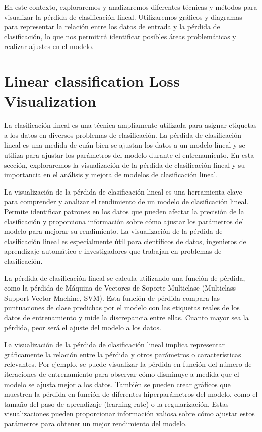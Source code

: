 \documentclass[twoside,10pt]{article}
\numberwithin{equation}{section}
\begin{document}
En este contexto, exploraremos y analizaremos diferentes técnicas y métodos para visualizar la pérdida de clasificación lineal. Utilizaremos gráficos y diagramas para representar la relación entre los datos de entrada y la pérdida de clasificación, lo que nos permitirá identificar posibles áreas problemáticas y realizar ajustes en el modelo.

\section{Linear classification Loss Visualization}

La clasificación lineal es una técnica ampliamente utilizada para asignar etiquetas a los datos en diversos problemas de clasificación. La pérdida de clasificación lineal es una medida de cuán bien se ajustan los datos a un modelo lineal y se utiliza para ajustar los parámetros del modelo durante el entrenamiento. En esta sección, exploraremos la visualización de la pérdida de clasificación lineal y su importancia en el análisis y mejora de modelos de clasificación lineal.

La visualización de la pérdida de clasificación lineal es una herramienta clave para comprender y analizar el rendimiento de un modelo de clasificación lineal. Permite identificar patrones en los datos que pueden afectar la precisión de la clasificación y proporciona información sobre cómo ajustar los parámetros del modelo para mejorar su rendimiento. La visualización de la pérdida de clasificación lineal es especialmente útil para científicos de datos, ingenieros de aprendizaje automático e investigadores que trabajan en problemas de clasificación.

La pérdida de clasificación lineal se calcula utilizando una función de pérdida, como la pérdida de Máquina de Vectores de Soporte Multiclase (Multiclass Support Vector Machine, SVM). Esta función de pérdida compara las puntuaciones de clase predichas por el modelo con las etiquetas reales de los datos de entrenamiento y mide la discrepancia entre ellas. Cuanto mayor sea la pérdida, peor será el ajuste del modelo a los datos.

La visualización de la pérdida de clasificación lineal implica representar gráficamente la relación entre la pérdida y otros parámetros o características relevantes. Por ejemplo, se puede visualizar la pérdida en función del número de iteraciones de entrenamiento para observar cómo disminuye a medida que el modelo se ajusta mejor a los datos. También se pueden crear gráficos que muestren la pérdida en función de diferentes hiperparámetros del modelo, como el tamaño del paso de aprendizaje (learning rate) o la regularización. Estas visualizaciones pueden proporcionar información valiosa sobre cómo ajustar estos parámetros para obtener un mejor rendimiento del modelo.
\end{document}
